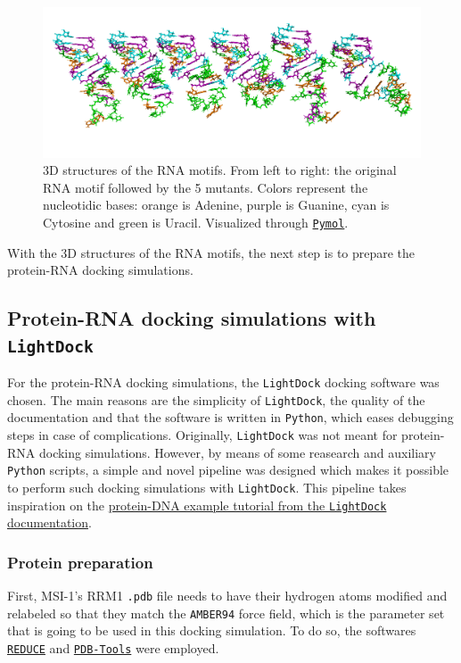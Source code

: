 \begin{figure}[htbp!]
    \centering
    \includegraphics[width=\linewidth]{assets/RNAs.png}
    \caption{3D structures of the RNA motifs. From left to right: the original RNA motif followed by the 5 mutants. Colors represent the nucleotidic bases: orange is Adenine, purple is Guanine, cyan is Cytosine and green is Uracil. Visualized through \href{https://pymol.org/2/}{\texttt{Pymol}}.}
    \label{fig:RNAs}
\end{figure}

With the 3D structures of the RNA motifs, the next step is to prepare the protein-RNA docking simulations.

\subsection{Protein-RNA docking simulations with \texttt{LightDock}}

For the protein-RNA docking simulations, the \texttt{LightDock} \cite{jimenez_garcia_2017} docking software was chosen. The main reasons are the simplicity of \texttt{LightDock}, the quality of the documentation and that the software is written in \texttt{Python}, which eases debugging steps in case of complications. Originally, \texttt{LightDock} was not meant for protein-RNA docking simulations. However, by means of some reasearch and auxiliary \texttt{Python} scripts, a simple and novel pipeline was designed which makes it possible to perform such docking simulations with \texttt{LightDock}. This pipeline takes inspiration on the \href{https://lightdock.org/tutorials/0.9.3/dna_docking}{protein-DNA example tutorial from the \texttt{LightDock} documentation}.

\subsubsection{Protein preparation}

First, MSI-1's RRM1 \texttt{.pdb} file needs to have their hydrogen atoms modified and relabeled so that they match the \texttt{AMBER94} force field, which is the parameter set that is going to be used in this docking simulation. To do so, the softwares \href{https://github.com/rlabduke/reduce}{\texttt{REDUCE}} and \href{https://github.com/haddocking/pdb-tools/}{\texttt{PDB-Tools}} \cite{rodrigues_2018} were employed.\\

